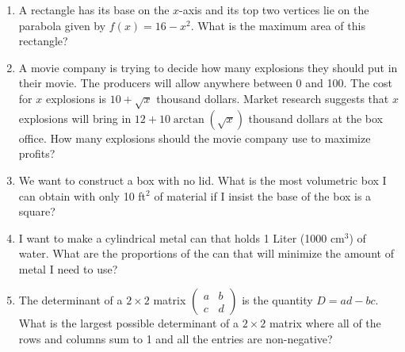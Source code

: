 \documentclass{article}
\newcommand{\R}{\mathbb{R}}
\begin{document}
\begin{enumerate}
\item A rectangle has its base on the $x$-axis and its top two vertices lie on the parabola given by $f(x)=16-x^2$. What is the maximum area of this rectangle?
\item A movie company is trying to decide how many explosions they should put in their movie. The producers will allow anywhere between 0 and 100. The cost for $x$ explosions is $10+\sqrt{x}$ thousand dollars. Market research suggests that $x$ explosions will bring in $12+10\arctan(\sqrt{x})$ thousand dollars at the box office. How many explosions should the movie company use to maximize profits?
\item We want to construct a box with no lid. What is the most volumetric box I can obtain with only 10 ft$^2$ of material if I insist the base of the box is a square?
\item I want to make a cylindrical metal can that holds 1 Liter (1000 cm$^3$) of water. What are the proportions of the can that will minimize the amount of metal I need to use?
\item The determinant of a $2\times 2$ matrix $\begin{pmatrix}a & b \\ c & d\end{pmatrix}$ is the quantity $D=ad-bc$. What is the largest possible determinant of a $2\times 2$ matrix where all of the rows and columns sum to 1 and all the entries are non-negative?
\end{enumerate}






\newpage




\end{document}
